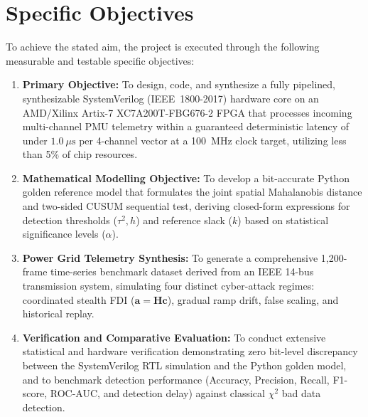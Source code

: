 \documentclass[12pt,a4paper]{report}
\begin{document}
\section{Specific Objectives}
To achieve the stated aim, the project is executed through the following measurable
and testable specific objectives:
\begin{enumerate}
    \item \textbf{Primary Objective:} To design, code, and synthesize a fully
    pipelined, synthesizable SystemVerilog (IEEE~1800-2017) hardware core on an
    AMD/Xilinx Artix-7 XC7A200T-FBG676-2 FPGA that processes incoming multi-channel
    PMU telemetry within a guaranteed deterministic latency of under $1.0~\mu\text{s}$
    per 4-channel vector at a 100~MHz clock target, utilizing less than 5\% of
    chip resources.
    \item \textbf{Mathematical Modelling Objective:} To develop a bit-accurate
    Python golden reference model that formulates the joint spatial Mahalanobis
    distance and two-sided CUSUM sequential test, deriving closed-form expressions
    for detection thresholds ($\tau^2, h$) and reference slack ($k$) based on
    statistical significance levels ($\alpha$).
    \item \textbf{Power Grid Telemetry Synthesis:} To generate a comprehensive
    1,200-frame time-series benchmark dataset derived from an IEEE 14-bus transmission
    system, simulating four distinct cyber-attack regimes: coordinated stealth FDI
    ($\boldsymbol{a} = \boldsymbol{H}\boldsymbol{c}$), gradual ramp drift,
    false scaling, and historical replay.
    \item \textbf{Verification and Comparative Evaluation:} To conduct extensive
    statistical and hardware verification demonstrating zero bit-level discrepancy
    between the SystemVerilog RTL simulation and the Python golden model, and to
    benchmark detection performance (Accuracy, Precision, Recall, F1-score, ROC-AUC,
    and detection delay) against classical $\chi^2$ bad data detection.
\end{enumerate}
\end{document}
